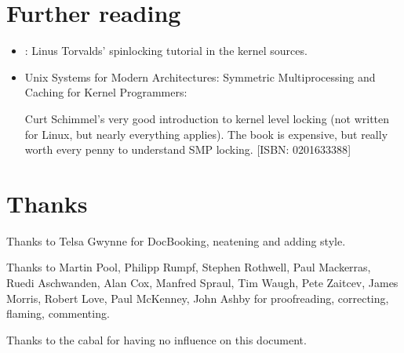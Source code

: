 \documentclass[a4paper,8pt,english]{sphinxmanual}
\begin{document}
\section{Further reading}
\label{kernel-hacking/locking:further-reading}\begin{itemize}
\item {} 
: Linus Torvalds' spinlocking
tutorial in the kernel sources.

\item {} 
Unix Systems for Modern Architectures: Symmetric Multiprocessing and
Caching for Kernel Programmers:

Curt Schimmel's very good introduction to kernel level locking (not
written for Linux, but nearly everything applies). The book is
expensive, but really worth every penny to understand SMP locking.
{[}ISBN: 0201633388{]}

\end{itemize}


\section{Thanks}
\label{kernel-hacking/locking:thanks}
Thanks to Telsa Gwynne for DocBooking, neatening and adding style.

Thanks to Martin Pool, Philipp Rumpf, Stephen Rothwell, Paul Mackerras,
Ruedi Aschwanden, Alan Cox, Manfred Spraul, Tim Waugh, Pete Zaitcev,
James Morris, Robert Love, Paul McKenney, John Ashby for proofreading,
correcting, flaming, commenting.

Thanks to the cabal for having no influence on this document.
\end{document}

